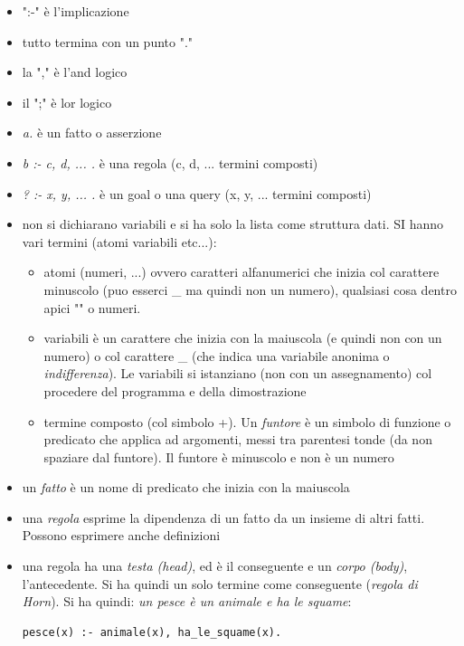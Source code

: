 \documentclass[a4paper,12pt, oneside]{book}
\begin{document}
\begin{itemize}
	\item ":-" è l'implicazione
	\item tutto termina con un punto "."
	\item la "," è l'and logico
	\item il ";" è lor logico
	\item \textit{a.} è un fatto o asserzione
	\item \textit{b :- c, d, ... .} è una regola (c, d, ... termini composti)
	\item \textit{? :- x, y, ... .} è un goal o una query (x, y, ... termini composti)
	\item non si dichiarano variabili e si ha solo la lista come struttura dati. SI hanno vari termini (atomi variabili etc...):
	      \begin{itemize}
		      \item atomi (numeri, ...) ovvero caratteri alfanumerici che inizia col carattere minuscolo (puo esserci \_ ma quindi non un numero), qualsiasi cosa dentro apici "" o numeri.
		      \item variabili è un carattere che inizia con la maiuscola (e quindi non con un numero) o col carattere \_ (che indica una variabile anonima o \textit{indifferenza}). Le variabili si istanziano (non con un assegnamento) col procedere del programma e della dimostrazione
		      \item termine composto (col simbolo +). Un \textit{funtore} è un simbolo di funzione o predicato che applica ad argomenti, messi tra parentesi tonde (da non spaziare dal funtore). Il funtore è minuscolo e non è un numero
	      \end{itemize}
	\item un \textit{fatto} è un nome di predicato che inizia con la maiuscola
	\item una \textit{regola} esprime la dipendenza di un fatto da un insieme di altri fatti. Possono esprimere anche definizioni
	\item una regola ha una \textit{testa (head)}, ed è il conseguente e un \textit{corpo (body)}, l'antecedente. Si ha quindi un solo termine come conseguente (\textit{regola di Horn}). Si ha quindi:
	      \textit{un pesce è un animale e ha le squame}:
	      \begin{verbatim}
pesce(x) :- animale(x), ha_le_squame(x).
\end{verbatim}

\end{itemize}
\end{document}
